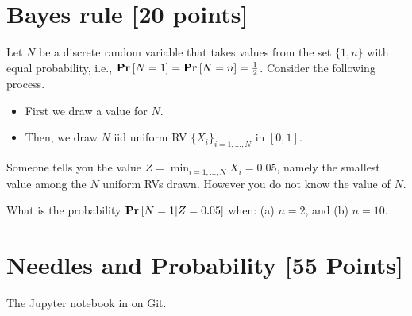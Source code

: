  
\section{Bayes rule [20 points]}   

Let $N$ be a discrete random variable that takes values from the set $\{1,n\}$ with equal probability, i.e., ${{\bf{Pr}}\left[{N=1}\right]}={{\bf{Pr}}\left[{N=n}\right]}=\frac{1}{2}$. Consider the following process. 

\begin{itemize}
	\item First we draw a value for $N$.
	\item Then, we draw $N$ iid uniform RV $\{X_i\}_{i=1,\ldots,N}$ in $[0,1]$.
\end{itemize}

Someone tells you the value $Z=\min_{i=1,\ldots,N} X_i = 0.05$, namely the smallest value among the $N$ uniform RVs drawn. However you do not know the value of $N$.  

 

\begin{tcolorbox}
	What is the probability ${{\bf{Pr}}\left[{N=1|Z=0.05}\right]}$ when: (a) $n=2$, and (b) $n=10$. 
 \end{tcolorbox}



\section{Needles and Probability [55 Points] }  

 The Jupyter notebook in on Git.
 


